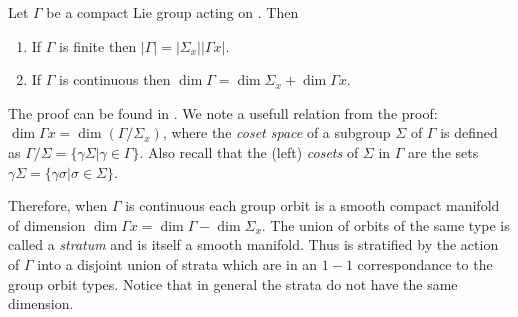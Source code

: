 \begin{proposition}
 Let $\Gamma$ be a compact Lie group acting on . Then
 \begin{enumerate}
  \item If $\Gamma$ is finite then $|\Gamma|=|\Sigma_x||\Gamma x|$.
  \item If $\Gamma$ is continuous then $\dim \Gamma = \dim \Sigma_x+\dim \Gamma x$.
 \end{enumerate}
\end{proposition}
The proof can be found in . We note a usefull relation from the proof: $\dim\Gamma x =\dim(\Gamma/\Sigma_x)$, where the \emph{coset space} of a subgroup $\Sigma$  of $\Gamma$ is defined as $\Gamma/\Sigma=\{\gamma\Sigma|\gamma\in\Gamma\}$. Also recall that the (left) \emph{cosets} of $\Sigma$ in $\Gamma$ are the sets $\gamma\Sigma=\{\gamma\sigma|\sigma\in\Sigma\}$.

Therefore, when $\Gamma$ is continuous each group orbit is a smooth compact manifold of dimension
$\dim \Gamma x=\dim \Gamma-\dim \Sigma_x$. The union of orbits of the same type is called a \emph{stratum}
and is itself a smooth manifold. Thus  is stratified by the action of $\Gamma$ into
a disjoint union of strata which are in an $1-1$ correspondance to the group orbit types. Notice that in general
the strata do not have the same dimension.



